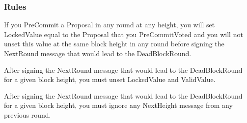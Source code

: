 \subsubsection{Rules}

If you PreCommit a Proposal in any round at any height, you will set
LockedValue equal to the Proposal that you PreCommitVoted and you will
not unset this value at the same block height in any round before
signing the NextRound message that would lead to the DeadBlockRound.

After signing the NextRound message that would lead to the
DeadBlockRound for a given block height, you must unset LockedValue and
ValidValue.

After signing the NextRound message that would lead to the
DeadBlockRound for a given block height, you must ignore any NextHeight
message from any previous round.



